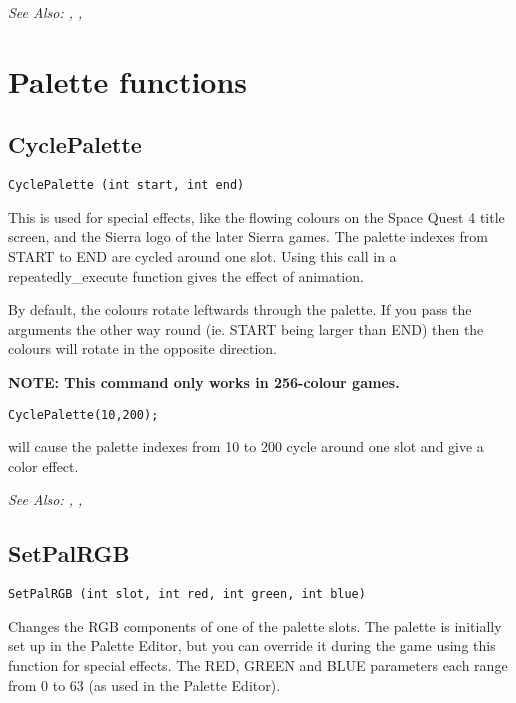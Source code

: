 \it{See Also:} ,
, 


\section{Palette functions}%

\subsection{CyclePalette}\label{CyclePalette}%

\begin{verbatim}
CyclePalette (int start, int end)
\end{verbatim}
This is used for special effects, like the flowing colours on the Space
Quest 4 title screen, and the Sierra logo of the later Sierra games.
The palette indexes from START to END are cycled around one slot. Using
this call in a repeatedly_execute function gives the effect of animation.

By default, the colours rotate leftwards through the palette. If you pass
the arguments the other way round (ie. START being larger than END) then
the colours will rotate in the opposite direction.

\bf{NOTE:} This command only works in 256-colour games.

\begin{verbatim}
CyclePalette(10,200);
\end{verbatim}
will cause the palette indexes from 10 to 200 cycle around one slot and give a color effect.

\it{See Also:} , , 


\subsection{SetPalRGB}\label{SetPalRGB}%

\begin{verbatim}
SetPalRGB (int slot, int red, int green, int blue)
\end{verbatim}
Changes the RGB components of one of the palette slots. The palette is
initially set up in the Palette Editor, but you can override it during the game using
this function for special effects. The RED, GREEN and BLUE parameters each
range from 0 to 63 (as used in the Palette Editor).

